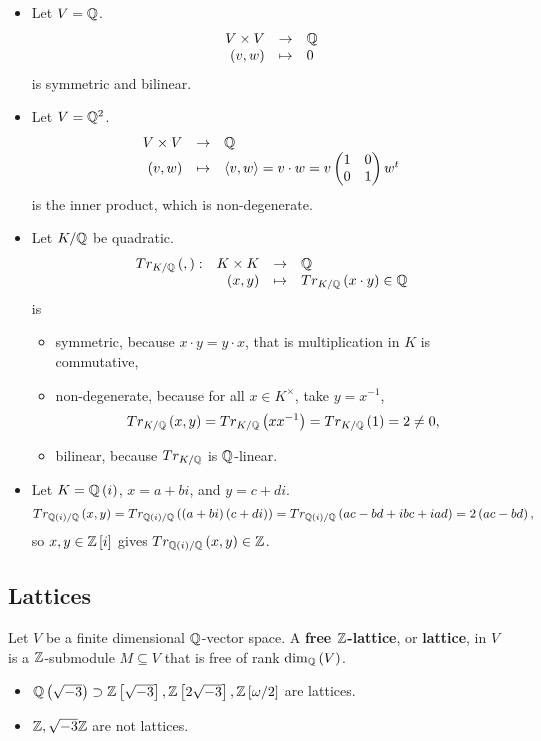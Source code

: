 \begin{example*}
\hfill
\begin{itemize}
\item Let $ V = \mathbb{Q} $.
$$ \function{V \times V}{\Q}{\rb{v, w}}{0} $$
is symmetric and bilinear.
\item Let $ V = \mathbb{Q}^2 $.
$$ \function{V \times V}{\Q}{\rb{v, w}}{\ab{v, w} = v \cdot w = v\twobytwo{1}{0}{0}{1}w^t} $$
is the inner product, which is non-degenerate.
\item Let $ K / \mathbb{Q} $ be quadratic.
$$ \function[Tr_{K / \Q}\rb{,}]{K \times K}{\Q}{\rb{x, y}}{Tr_{K / \Q}\rb{x \cdot y} \in \Q} $$
is
\begin{itemize}
\item symmetric, because $ x \cdot y = y \cdot x $, that is multiplication in $ K $ is commutative,
\item non-degenerate, because for all $ x \in K^\times $, take $ y = x^{-1} $,
$$ Tr_{K / \mathbb{Q}}\left( x, y \right) = Tr_{K / \mathbb{Q}}\left( xx^{-1} \right) = Tr_{K / \mathbb{Q}}\left( 1 \right) = 2 \ne 0, $$
\item bilinear, because $ Tr_{K / \mathbb{Q}} $ is $ \mathbb{Q} $-linear.
\end{itemize}
\item Let $ K = \mathbb{Q}\left( i \right) $, $ x = a + bi $, and $ y = c + di $.
$$ Tr_{\mathbb{Q}\left( i \right) / \mathbb{Q}}\left( x, y \right) = Tr_{\mathbb{Q}\left( i \right) / \mathbb{Q}}\left( \left( a + bi \right)\left( c + di \right) \right) = Tr_{\mathbb{Q}\left( i \right) / \mathbb{Q}}\left( ac - bd + ibc + iad \right) = 2\left( ac - bd \right), $$
so $ x, y \in \mathbb{Z}\left[ i \right] $ gives $ Tr_{\mathbb{Q}\left( i \right) / \mathbb{Q}}\left( x, y \right) \in \mathbb{Z} $.
\end{itemize}
\end{example*}

\pagebreak

\subsection{Lattices}


\begin{definition}
Let $ V $ be a finite dimensional $ \mathbb{Q} $-vector space. A \textbf{free $ \mathbb{Z} $-lattice}, or \textbf{lattice}, in $ V $ is a $ \mathbb{Z} $-submodule $ M \subseteq V $ that is free of rank $ \dim_{\mathbb{Q}}\left( V \right) $.
\end{definition}

\begin{example*}
\hfill
\begin{itemize}
\item $ \mathbb{Q}\left( \sqrt{-3} \right) \supset \mathbb{Z}\left[ \sqrt{-3} \right], \mathbb{Z}\left[ 2\sqrt{-3} \right], \mathbb{Z}\left[ \omega / 2 \right] $ are lattices.
\item $ \mathbb{Z}, \sqrt{-3}\mathbb{Z} $ are not lattices.
\end{itemize}
\end{example*}

